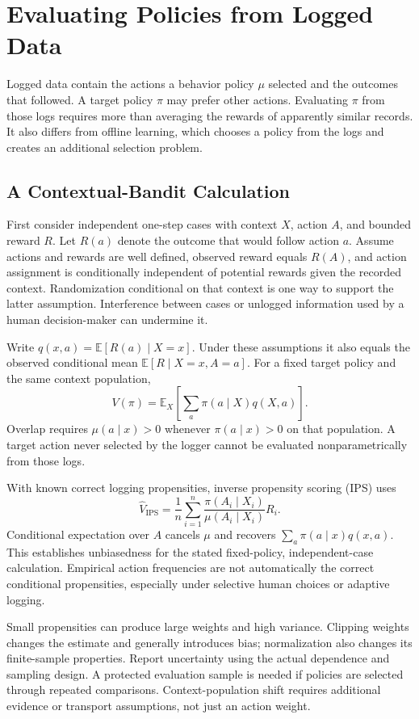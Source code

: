\section{Evaluating Policies from Logged Data}

Logged data contain the actions a behavior policy $\mu$ selected and the outcomes that followed. A target policy $\pi$ may prefer other actions. Evaluating $\pi$ from those logs requires more than averaging the rewards of apparently similar records. It also differs from offline learning, which chooses a policy from the logs and creates an additional selection problem.

\subsection{A Contextual-Bandit Calculation}

First consider independent one-step cases with context $X$, action $A$, and bounded reward $R$. Let $R(a)$ denote the outcome that would follow action $a$. Assume actions and rewards are well defined, observed reward equals $R(A)$, and action assignment is conditionally independent of potential rewards given the recorded context. Randomization conditional on that context is one way to support the latter assumption. Interference between cases or unlogged information used by a human decision-maker can undermine it.

Write $q(x,a)=\mathbb E[R(a)\mid X=x]$. Under these assumptions it also equals the observed conditional mean $\mathbb E[R\mid X=x,A=a]$. For a fixed target policy and the same context population,
\[
V(\pi)=\mathbb E_X\left[\sum_a\pi(a\mid X)q(X,a)\right].
\]
Overlap requires $\mu(a\mid x)>0$ whenever $\pi(a\mid x)>0$ on that population. A target action never selected by the logger cannot be evaluated nonparametrically from those logs.

With known correct logging propensities, inverse propensity scoring (IPS) uses
\[
\hat V_{\mathrm{IPS}}=
\frac1n\sum_{i=1}^n
\frac{\pi(A_i\mid X_i)}{\mu(A_i\mid X_i)}R_i.
\]
Conditional expectation over $A$ cancels $\mu$ and recovers $\sum_a\pi(a\mid x)q(x,a)$. This establishes unbiasedness for the stated fixed-policy, independent-case calculation. Empirical action frequencies are not automatically the correct conditional propensities, especially under selective human choices or adaptive logging.

Small propensities can produce large weights and high variance. Clipping weights changes the estimate and generally introduces bias; normalization also changes its finite-sample properties. Report uncertainty using the actual dependence and sampling design. A protected evaluation sample is needed if policies are selected through repeated comparisons. Context-population shift requires additional evidence or transport assumptions, not just an action weight.

